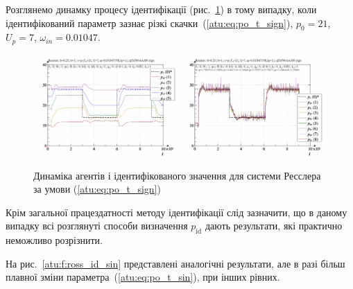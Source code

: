 Розглянемо динамку процесу ідентифікації (рис.~\ref{atu:f:ross_id_sign})
в тому випадку, коли ідентифікований параметр зазнає різкі
скачки~(\ref{atu:eq:po_t_sign}),
$ p_0 = 21 $,
$ U_p = 7 $,
$ \omega_{in} = 0.01047 $.

\begin{figure}[ht!]
\begin{center}
  \includegraphics[width=0.49\textwidth]{p/cha/ross/ross_id-p_t_pi_ql3rlWvnAAW_sign.png}
  \hfill
  \includegraphics[width=0.49\textwidth]{p/cha/ross/ross_id-p_t_p_ql3rlWvnAAW_sign.png}
\end{center}
\caption{Динаміка агентів і ідентифікованого значення для системи Ресслера за умови (\ref{atu:eq:po_t_sign})}
\label{atu:f:ross_id_sign}
\end{figure}

Крім загальної працездатності методу ідентифікації слід
зазначити, що в даному випадку всі розглянуті способи визначення
$ p_\mathrm{id} $ дають результати, які практично неможливо розрізнити.

На рис.~\ref{atu:f:ross_id_sin} представлені аналогічні результати, але
в разі більш плавної зміни параметра~(\ref{atu:eq:po_t_sin}), при інших
рівних.


